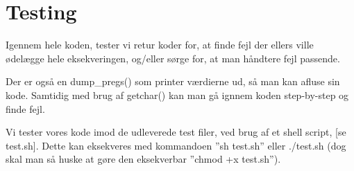 \documentclass[11pt,a4paper]{report}
\theoremstyle{plain}
\theoremstyle{definition}
\theoremstyle{remark}
\numberwithin{equation}{section}
\begin{document}
\section*{Testing}
Igennem hele koden, tester vi retur koder for, at finde fejl der ellers ville ødelægge hele eksekveringen, og/eller sørge for, at man håndtere fejl passende.

Der er også en dump\_pregs() som printer værdierne ud, så man kan afluse sin kode. Samtidig med brug af getchar() kan man gå ignnem koden step-by-step og finde fejl.

Vi tester vores kode imod de udleverede test filer, ved brug af et shell script, [se test.sh].
Dette kan eksekveres med kommandoen ”sh test.sh” eller ./test.sh (dog skal man så huske at gøre den eksekverbar ”chmod +x test.sh”).


\nocite{Patterson:2013:COD:2568134}



\end{document}
